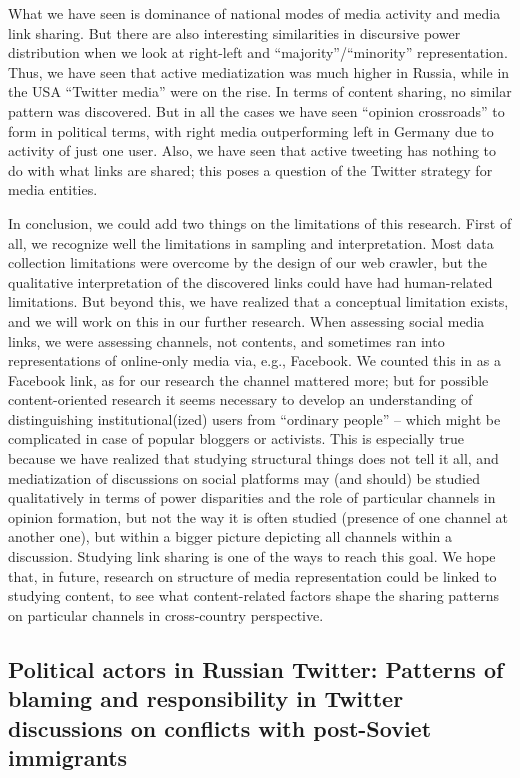 What we have seen is dominance of national modes of media activity and media link sharing. But there are also interesting similarities in discursive power distribution when we look at right-left and “majority”/“minority” representation. Thus, we have seen that active mediatization was much higher in Russia, while in the USA “Twitter media” were on the rise. In terms of content sharing, no similar pattern was discovered. But in all the cases we have seen “opinion crossroads” to form in political terms, with right media outperforming left in Germany due to activity of just one user. Also, we have seen that active tweeting has nothing to do with what links are shared; this poses a question of the Twitter strategy for media entities.

In conclusion, we could add two things on the limitations of this research. First of all, we recognize well the limitations in sampling and interpretation. Most data collection limitations were overcome by the design of our web crawler, but the qualitative interpretation of the discovered links could have had human-related limitations. But beyond this, we have realized that a conceptual limitation exists, and we will work on this in our further research. When assessing social media links, we were assessing channels, not contents, and sometimes ran into representations of online-only media via, e.g., Facebook. We counted this in as a Facebook link, as for our research the channel mattered more; but for possible content-oriented research it seems necessary to develop an understanding of distinguishing institutional(ized) users from “ordinary people” -- which might be complicated in case of popular bloggers or activists. This is especially true because we have realized that studying structural things does not tell it all, and mediatization of discussions on social platforms may (and should) be studied qualitatively in terms of power disparities and the role of particular channels in opinion formation, but not the way it is often studied (presence of one channel at another one), but within a bigger picture depicting all channels within a discussion. Studying link sharing is one of the ways to reach this goal. We hope that, in future, research on structure of media representation could be linked to studying content, to see what content-related factors shape the sharing patterns on particular channels in cross-country perspective.

\subsection{Political actors in Russian Twitter: Patterns of blaming and responsibility in Twitter discussions on conflicts with post-Soviet immigrants}\label{subsec:ch2/sec5/sub4}

